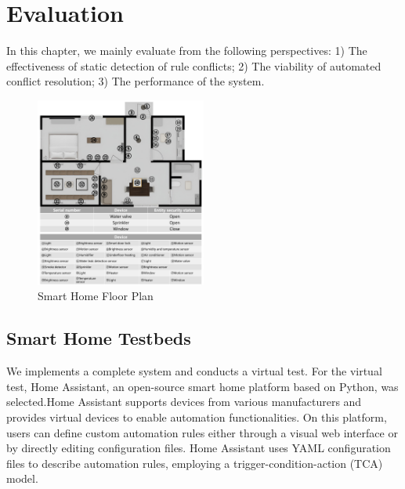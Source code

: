 \section{Evaluation}
In this chapter, we mainly evaluate from the following perspectives: 1) The effectiveness of static detection of rule conflicts; 2) The viability of automated conflict resolution; 3) The performance of the system.

\begin{figure}[htbp]
	\centering
	\includegraphics[width=0.5\textwidth]{figure/smarthome.png}
	\caption{Smart Home Floor Plan}
	\label{smarthome_floorplan}
\end{figure}

\subsection{Smart Home Testbeds}

We implements a complete system and conducts a virtual test. For the virtual test, Home Assistant, an open-source smart home platform based on Python, was selected.Home Assistant supports devices from various manufacturers and provides virtual devices to enable automation functionalities. On this platform, users can define custom automation rules either through a visual web interface or by directly editing configuration files. Home Assistant uses YAML configuration files to describe automation rules, employing a trigger-condition-action (TCA) model.

